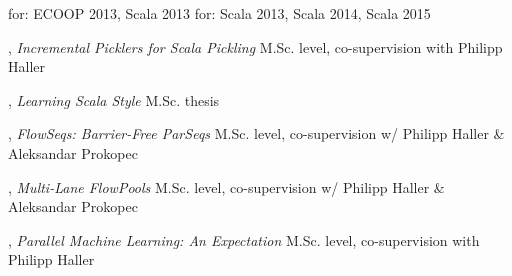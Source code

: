 \documentclass[9pt]{article}
\begin{document}
\medskip
{} for: ECOOP 2013, Scala 2013
\newline{} for: Scala 2013, Scala 2014, Scala 2015

\bigskip




\medskip
{}

, {\em Incremental Picklers for Scala Pickling} 
\newline\noindent M.Sc. level, co-supervision with Philipp Haller
\medskip

, {\em Learning Scala Style} 
\newline\noindent M.Sc. thesis
\medskip

, {\em FlowSeqs: Barrier-Free ParSeqs} 
\newline\noindent M.Sc. level, co-supervision w/ Philipp Haller \& Aleksandar Prokopec
\medskip

, {\em Multi-Lane FlowPools} 
\newline\noindent M.Sc. level, co-supervision w/ Philipp Haller \& Aleksandar Prokopec
\medskip

, {\em Parallel Machine Learning: An Expectation} 
\newline{}
\newline\noindent M.Sc. level, co-supervision with Philipp Haller
\medskip
\end{document}
